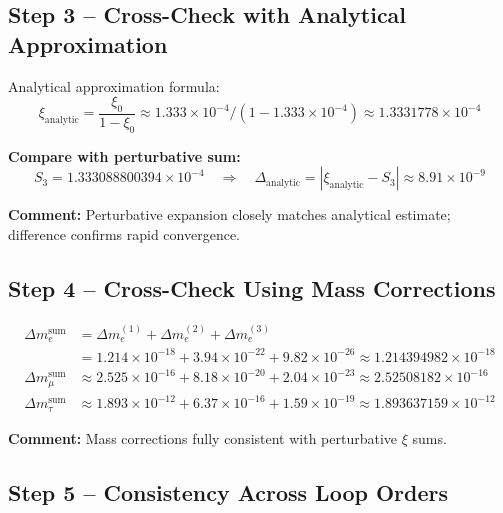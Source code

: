 \documentclass[12pt,a4paper]{article}
\begin{document}
\subsection{Step 3 – Cross-Check with Analytical Approximation}

Analytical approximation formula:
\begin{equation}
	\xi_\text{analytic} = \frac{\xi_0}{1 - \xi_0} \approx 1.333 \times 10^{-4} / (1 - 1.333 \times 10^{-4}) \approx 1.3331778 \times 10^{-4}
\end{equation}

\textbf{Compare with perturbative sum:}
\begin{equation}
	S_3 = 1.333088800394 \times 10^{-4} \quad \Rightarrow \quad \Delta_\text{analytic} = |\xi_\text{analytic} - S_3| \approx 8.91 \times 10^{-9}
\end{equation}

\textbf{Comment:} Perturbative expansion closely matches analytical estimate; difference confirms rapid convergence.

\subsection{Step 4 – Cross-Check Using Mass Corrections}

\begin{align}
	\Delta m_e^\text{sum} &= \Delta m_e^{(1)} + \Delta m_e^{(2)} + \Delta m_e^{(3)} \\
	&= 1.214 \times 10^{-18} + 3.94 \times 10^{-22} + 9.82 \times 10^{-26} \approx 1.214394982 \times 10^{-18} \\
	\Delta m_\mu^\text{sum} &\approx 2.525 \times 10^{-16} + 8.18 \times 10^{-20} + 2.04 \times 10^{-23} \approx 2.52508182 \times 10^{-16} \\
	\Delta m_\tau^\text{sum} &\approx 1.893 \times 10^{-12} + 6.37 \times 10^{-16} + 1.59 \times 10^{-19} \approx 1.893637159 \times 10^{-12}
\end{align}

\textbf{Comment:} Mass corrections fully consistent with perturbative $\xi$ sums.

\subsection{Step 5 – Consistency Across Loop Orders}
\end{document}
